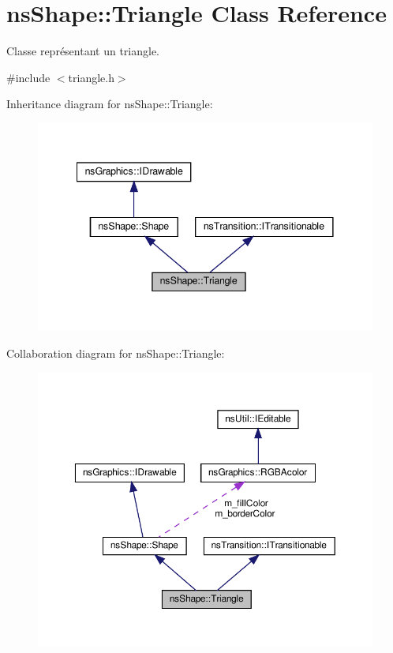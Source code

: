 \hypertarget{classns_shape_1_1_triangle}{}\section{ns\+Shape\+:\+:Triangle Class Reference}
\label{classns_shape_1_1_triangle}


Classe représentant un triangle.  




{\ttfamily \#include $<$triangle.\+h$>$}



Inheritance diagram for ns\+Shape\+:\+:Triangle\+:
\nopagebreak
\begin{figure}[H]
\begin{center}
\leavevmode
\includegraphics[width=341pt]{classns_shape_1_1_triangle__inherit__graph}
\end{center}
\end{figure}


Collaboration diagram for ns\+Shape\+:\+:Triangle\+:
\nopagebreak
\begin{figure}[H]
\begin{center}
\leavevmode
\includegraphics[width=350pt]{classns_shape_1_1_triangle__coll__graph}
\end{center}
\end{figure}
